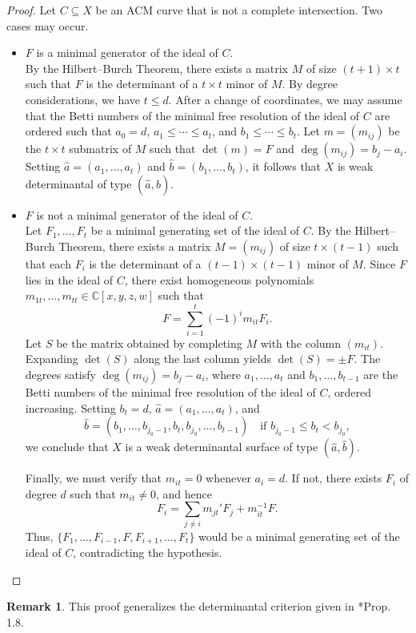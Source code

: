 \documentclass[12pt,reqno]{amsart}
\theoremstyle{plain}
\theoremstyle{definition}
\newtheorem{rmk}[theorem]{Remark}
\theoremstyle{remark}
\theoremstyle{definition}
\begin{document}
\begin{proof}
Let $C\subseteq X$ be an ACM curve that is not a complete intersection. Two cases may occur.

\begin{itemize}
\item[Case 1:] $F$ is a minimal generator of the ideal of $C$.\\
By the Hilbert--Burch Theorem, there exists a matrix $M$ of size $(t+1)\times t$ such that $F$ is the determinant of a $t\times t$ minor of $M$. By degree considerations, we have $t\leq d$. After a change of coordinates, we may assume that the Betti numbers of the minimal free resolution of the ideal of $C$ are ordered such that $a_{0}=d$, $a_{1}\leq\cdots\leq a_{t}$, and $b_{1}\leq\cdots\leq b_{t}$. Let $m=(m_{ij})$ be the $t\times t$ submatrix of $M$ such that $\det(m)=F$ and $\deg(m_{ij})=b_j-a_i$. Setting $\hat{a}=(a_1,\ldots,a_t)$ and $\hat{b}=(b_1,\ldots,b_t)$, it follows that $X$ is weak determinantal of type $(\hat{a},\hat{b})$.

\item[Case 2:] $F$ is not a minimal generator of the ideal of $C$.\\
Let $F_1,\ldots,F_t$ be a minimal generating set of the ideal of $C$. By the Hilbert--Burch Theorem, there exists a matrix $M=(m_{ij})$ of size $t\times(t-1)$ such that each $F_i$ is the determinant of a $(t-1)\times(t-1)$ minor of $M$. Since $F$ lies in the ideal of $C$, there exist homogeneous polynomials $m_{1t},\ldots,m_{tt}\in\mathds{C}[x,y,z,w]$ such that
\[
F=\sum_{i=1}^{t}(-1)^i m_{it}F_i.
\]
Let $S$ be the matrix obtained by completing $M$ with the column $(m_{it})$. Expanding $\det(S)$ along the last column yields $\det(S)=\pm F$. The degrees satisfy $\deg(m_{ij})=b_j-a_i$, where $a_1,\ldots,a_t$ and $b_1,\ldots,b_{t-1}$ are the Betti numbers of the minimal free resolution of the ideal of $C$, ordered increasing. Setting $b_t=d$, $\hat{a}=(a_1,\ldots,a_t)$, and
\[
\hat{b}=(b_1,\ldots,b_{j_0-1},b_t,b_{j_0},\ldots,b_{t-1})
\quad\text{if } b_{j_0-1}\leq b_t<b_{j_0},
\]
we conclude that $X$ is a weak determinantal surface of type $(\hat{a},\hat{b})$.

Finally, we must verify that $m_{it}=0$ whenever $a_i=d$. If not, there exists $F_i$ of degree $d$ such that $m_{it}\neq0$, and hence
\[
F_i=\sum_{j\neq i} m_{jt}'F_j + m_{it}^{-1}F.
\]
Thus, $\{F_1,\ldots,F_{i-1},F,F_{i+1},\ldots,F_t\}$ would be a minimal generating set of the ideal of $C$, contradicting the hypothesis.
\end{itemize}
\end{proof}
\begin{rmk}
This proof generalizes the determinantal criterion given in \cite{LLV}*{Prop. 1.8}.
\end{rmk}
\end{document}
